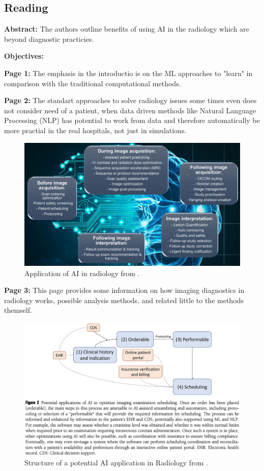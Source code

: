 \subsection{Reading}
    \textbf{Abstract:}
    The authors outline benefits of using AI in the radiology which are beyond diagnostic practicies.
    
    \textbf{Objectives:}

    
    \textbf{Page 1:}
    The emphasis in the introductio is on the ML approaches to "learn" in comparison with the traditional computational methods.
    
    \textbf{Page 2:}
    The standart approaches to solve radiology issues some times even does not consider need of a patient, when data driven methods like Natural Language Processing (NLP) has potential to work from data and therefore automatically be more practial in the real hospitals, not just in simulations.
    \begin{figure}[H]
        \centering
        \includegraphics[width=1\textwidth]{figures/SR0012US23/fig1.png}
        \caption{Application of AI in radiology from \cite{x076}.}
        \label{fig1:SR0012US23}
    \end{figure}

    \textbf{Page 3:}
    This page provides some information on how imaging diagnostics in radiology works, possible analysis methods, and related little to the methods themself.
    \begin{figure}[H]
        \centering
        \includegraphics[width=1\textwidth]{figures/SR0012US23/fig2.png}
        \caption{Structure of a potential AI application in Radiology from \cite{x076}.}
        \label{fig2:SR0012US23}
    \end{figure}

